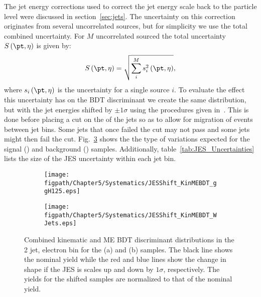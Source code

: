 The jet energy corrections used to correct the jet energy scale back to the particle level were discussed in section~\ref{sec:jets}.
The uncertainty on this correction originates from several uncorrelated sources, but for simplicity we use the total combined uncertainty.
For $M$ uncorrelated sourced the total uncertainty $S\left(\pt,\eta\right)$ is given by:
\begin{equation}
  S\left(\pt,\eta\right)=\sqrt{\sum_{i}^{M}s_{i}^{2}\left(\pt,\eta\right)},
\end{equation}
where $s_{i}\left(\pt,\eta\right)$ is the uncertainty for a single source $i$.
To evaluate the effect this uncertainty has on the BDT discriminant we create the same distribution, but with the jet energies shifted by $\pm1\sigma$ using the procedures given in~\cite{JECUncertainties,JECUncertaintySources}.
This is done before placing a cut on the \pt of the jets so as to allow for migration of events between jet bins.
Some jets that once failed the \pt cut may not pass and some jets might then fail the \pt cut.
Fig.~\ref{fig:JESShift_KinMEBDT} shows the the type of variations expected for the signal (\ggH) and background (\Wjets) samples.
Additionally, table~\ref{tab:JES_Uncertainties} lists the size of the JES uncertainty within each jet bin.

\begin{figure}[!hbt]
    \centering
    \begin{subfigure}[t]{0.48\textwidth}
        \texttt{[image: \\figpath/Chapter5/Systematics/JESShift\_KinMEBDT\_ggH125.eps]}
        \caption{}
        \label{fig:JESShift_KinMEBDT_ggH125}
    \end{subfigure}
    \begin{subfigure}[t]{0.48\textwidth}
        \texttt{[image: \\figpath/Chapter5/Systematics/JESShift\_KinMEBDT\_WJets.eps]}
        \caption{}
        \label{fig:JESShift_KinMEBDT_WJets}
    \end{subfigure}
    \caption{Combined kinematic and ME BDT discriminant distributions in the 2 jet, electron bin for the (a) \ggH and (b) \Wjets samples. The black line shows the nominal yield while the red and blue lines show the change in shape if the JES is scales up and down by $1\sigma$, respectively. The yields for the shifted samples are normalized to that of the nominal yield.}
    \label{fig:JESShift_KinMEBDT}
\end{figure}

